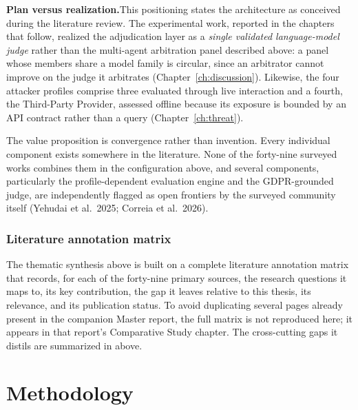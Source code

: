 \documentclass[12pt,a4paper]{report}
\begin{document}
\begin{notebox}
\textbf{Plan versus realization.}\quad This positioning states the architecture as conceived during the literature review. The experimental work, reported in the chapters that follow, realized the adjudication layer as a \emph{single validated language-model judge} rather than the multi-agent arbitration panel described above: a panel whose members share a model family is circular, since an arbitrator cannot improve on the judge it arbitrates (Chapter~\ref{ch:discussion}). Likewise, the four attacker profiles comprise three evaluated through live interaction and a fourth, the Third-Party Provider, assessed offline because its exposure is bounded by an API contract rather than a query (Chapter~\ref{ch:threat}).
\end{notebox}

\enlargethispage{2\baselineskip}%
The value proposition is convergence rather than invention. Every individual component exists somewhere in the literature. None of the forty-nine surveyed works combines them in the configuration above, and several components, particularly the profile-dependent evaluation engine and the GDPR-grounded judge, are independently flagged as open frontiers by the surveyed community itself (Yehudai et al.\ 2025; Correia et al.\ 2026).



\newpage
\section{Literature annotation matrix}
\label{sec:annotation-pointer}

The thematic synthesis above is built on a complete literature annotation matrix that records, for each
of the forty-nine primary sources, the research questions it maps to, its key contribution, the gap it
leaves relative to this thesis, its relevance, and its publication status. To avoid duplicating several
pages already present in the companion Master report, the full matrix is not reproduced here; it appears
in that report's Comparative Study chapter. The cross-cutting gaps it distils are summarized in
 above.



\part{Methodology}
\end{document}

